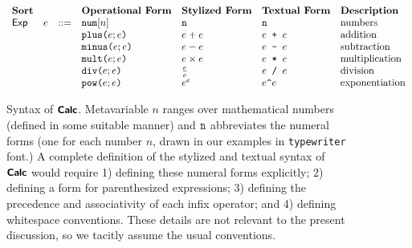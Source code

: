 \begin{figure}
\hspace{-5px}$\begin{array}{lrlllll}
\textbf{Sort} & & & \textbf{Operational Form} & \textbf{Stylized Form} & \textbf{Textual Form} & \textbf{Description}\\
\mathsf{Exp} & e & ::= & \anumintro{n} & \numintro{n} & \numintro{n} & \text{numbers}\\
&&& \aplus{e}{e} & e + e & e\texttt{ + }e & \text{addition} \\
&&& \aminus{e}{e} & e - e & e\texttt{ - }e & \text{subtraction}\\
&&& \amult{e}{e} & e \times e & e\texttt{ * }e & \text{multiplication}\\
&&& \adiv{e}{e} & \frac{e}{e} & e\texttt{ / }e & \text{division}\\
&&& \apow{e}{e} & {e}^{e} & e\verb|^|e & \text{exponentiation}
\end{array}$
\caption[Syntax of $\simplelang$]{Syntax of $\simplelang$. Metavariable $n$ ranges over mathematical numbers (defined in some suitable manner) and $\texttt{n}$ abbreviates the numeral forms (one for each number $n$, drawn in our examples in \texttt{typewriter} font.) A complete definition of the stylized and textual syntax of $\simplelang$ would require 1) defining these numeral forms explicitly; 2) defining a form for parenthesized expressions; 3) defining the precedence and associativity of each infix operator; and 4) defining whitespace conventions. These details are not relevant to the present discussion, so we tacitly assume the usual conventions.}
\label{fig:simple-example}
\end{figure}

